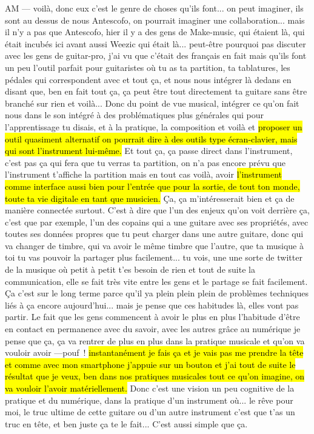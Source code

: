 AM — voilà, donc eux c'est le genre de choses qu'ils font... on peut imaginer, ils sont au dessus de nous Antescofo, on pourrait imaginer une collaboration... mais il n'y a pas que Antescofo, hier il y a des gens de Make-music, qui étaient là, qui était incubés ici avant aussi Weezic qui était là... peut-être pourquoi pas discuter avec les gens de guitar-pro, j'ai vu que c'était des français en fait mais qu'ils font un peu l'outil parfait pour guitaristes où tu as ta partition, ta tablatures, les pédales qui correspondent avec et tout ça, et nous nous intégrer là dedans en disant que, ben en fait tout ça, ça peut être tout directement ta guitare sans être branché sur rien et voilà... Donc du point de vue musical, intégrer ce qu'on fait nous dans le son intégré à des problématiques plus générales qui pour l'apprentissage tu disais, et à la pratique, la composition et voilà et \hl{proposer un outil quasiment alternatif on pourrait dire à des outils type écran-clavier, mais qui sont l'instrument lui-même.} Et tout ça, ça passe direct dans l'instrument, c'est pas ça qui fera que tu verras ta partition, on n'a pas encore prévu que l'instrument t'affiche la partition mais en tout cas voilà, avoir \hl{l'instrument comme interface aussi bien pour l'entrée que pour la sortie, de tout ton monde, toute ta vie digitale en tant que musicien.} Ça, ça m'intéresserait bien et ça de manière connectée surtout. 
C'est à dire que l'un des enjeux qu'on voit derrière ça, c'est que par exemple, l'un des copains qui a une guitare avec ses propriétés, avec toutes ses données propres que tu peut charger dans une autre guitare, donc qui va changer de timbre, qui va avoir le même timbre que l'autre, que ta musique à toi tu vas pouvoir la partager plus facilement... tu vois, une une sorte de twitter de la musique où petit à petit t'es besoin de rien et tout de suite la communication, elle se fait très vite entre les gens et le partage se fait facilement. Ça c'est sur le long terme parce qu'il ya plein plein plein de problèmes techniques liés à ça encore aujourd'hui... mais je pense que ces habitudes là, elles vont pas partir. Le fait que les gens commencent à avoir le plus en plus l'habitude d'être en contact en permanence avec du savoir, avec les autres grâce au numérique je pense que ça, ça va rentrer de plus en plus dans la pratique musicale et qu'on va vouloir avoir —pouf ! \hl{instantanément je fais ça et je vais pas me prendre la tête et comme avec mon smartphone j'appuie sur un bouton et j'ai tout de suite le résultat que je veux, ben dans nos pratiques musicales tout ce qu'on imagine, on va vouloir l'avoir matériellement.} Donc c'est une vision un peu cognitive de la pratique et du numérique, dans la pratique d'un instrument où... le rêve pour moi, le truc ultime de cette guitare ou d'un autre instrument c'est que t'as un truc en tête, et ben juste ça te le fait... C'est aussi simple que ça. 
